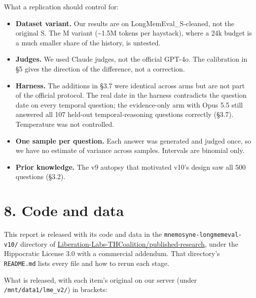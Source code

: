 \documentclass[11pt]{article}
\providecommand{\tightlist}{\setlength{\itemsep}{0pt}\setlength{\parskip}{0pt}}
\begin{document}
What a replication should control for:

\begin{itemize}
\tightlist
\item
  \textbf{Dataset variant.} Our results are on LongMemEval\_S-cleaned, not the original S. The M variant (\textasciitilde1.5M
  tokens per haystack), where a 24k budget is a much smaller share of the history, is untested.
\item
  \textbf{Judges.} We used Claude judges, not the official GPT-4o. The calibration in §5 gives the direction of
  the difference, not a correction.
\item
  \textbf{Harness.} The additions in §3.7 were identical across arms but are not part of the official protocol.
  The real date in the harness contradicts the question date on every temporal question; the evidence-only
  arm with Opus 5.5 still answered all 107 held-out temporal-reasoning questions correctly (§3.7).
  Temperature was not controlled.
\item
  \textbf{One sample per question.} Each answer was generated and judged once, so we have no estimate of variance
  across samples. Intervals are binomial only.
\item
  \textbf{Prior knowledge.} The v9 autopsy that motivated v10's design saw all 500 questions (§3.2).
\end{itemize}

\hypertarget{code-and-data}{%
\section{8. Code and data}\label{code-and-data}}

This report is released with its code and data in the \texttt{mnemosyne-longmemeval-v10/} directory of
\href{https://github.com/Liberation-Labs-THCoalition/published-research/tree/master/mnemosyne-longmemeval-v10}{Liberation-Labs-THCoalition/published-research}, under the Hippocratic License 3.0 with a
commercial addendum. That directory's \texttt{README.md} lists every file and how to rerun each stage.

What is released, with each item's original on our server (under \texttt{/mnt/data1/lme\_v2/}) in brackets:
\end{document}
